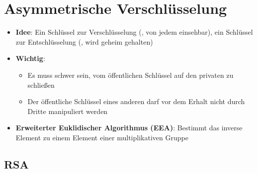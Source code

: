 \section{Asymmetrische Verschlüsselung}%
\label{asver:sec:asymmetrische_verschluesselung}

\begin{itemize}
	\item \textbf{Idee}: Ein Schlüssel zur Verschlüsselung (, von jedem einsehbar), ein Schlüssel zur Entschlüsselung (, wird geheim gehalten)
	\item \textbf{Wichtig}:
	\begin{itemize}
		\item Es muss schwer sein, vom öffentlichen Schlüssel auf den privaten zu schließen
		\item Der öffentliche Schlüssel eines anderen darf vor dem Erhalt nicht durch Dritte manipuliert werden
	\end{itemize}
	\item \textbf{Erweiterter Euklidischer Algorithmus (EEA)}: Bestimmt das inverse Element zu einem Element einer multiplikativen Gruppe
\end{itemize}

\subsection{RSA}%
\label{asver:sub:rsa}

